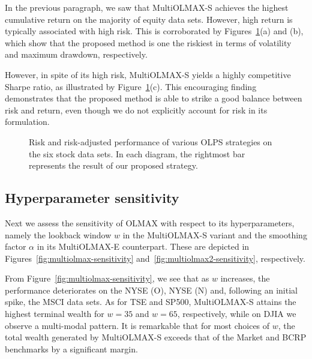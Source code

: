 In the previous paragraph, we saw that MultiOLMAX-S achieves the highest cumulative return on the majority of equity data sets. However, high return is typically associated with high risk. This is corroborated by Figures~\ref{fig:stock-metrics}(a) and (b), which show that the proposed method is one the riskiest in terms of volatility and maximum drawdown, respectively.

However, in spite of its high risk, MultiOLMAX-S yields a highly competitive Sharpe ratio, as illustrated by Figure~\ref{fig:stock-metrics}(c). This encouraging finding demonstrates that the proposed method is able to strike a good balance between risk and return, even though we do not explicitly account for risk in its formulation.

\begin{figure}[htp]
\caption{\footnotesize Risk and risk-adjusted performance of various OLPS strategies on the six stock data sets. In each diagram, the rightmost bar represents the result of our proposed strategy.}
\label{fig:stock-metrics}
\centering



\end{figure}

\subsection{Hyperparameter sensitivity}
\label{sec:olmax-hyperparameter-sensitivity}

Next we assess the sensitivity of OLMAX with respect to its hyperparameters, namely the lookback window $w$ in the MultiOLMAX-S variant and the smoothing factor $\alpha$ in its MultiOLMAX-E counterpart. These are depicted in Figures~\ref{fig:multiolmax-sensitivity} and~\ref{fig:multiolmax2-sensitivity}, respectively.

From Figure~\ref{fig:multiolmax-sensitivity}, we see that as $w$ increases, the performance deteriorates on the NYSE (O), NYSE (N) and, following an initial spike, the MSCI data sets. As for TSE and SP500, MultiOLMAX-S attains the highest terminal wealth for $w = 35$ and $w = 65$, respectively, while on DJIA we observe a multi-modal pattern. It is remarkable that for most choices of $w$, the total wealth generated by MultiOLMAX-S exceeds that of the Market and BCRP benchmarks by a significant margin.

